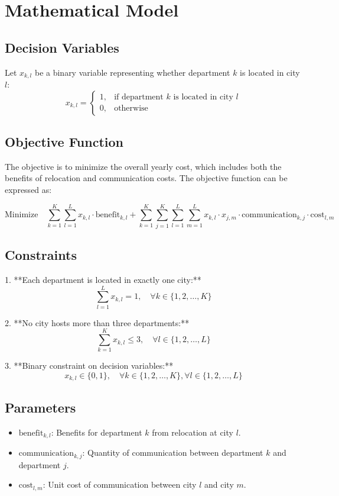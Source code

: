 \documentclass{article}
\begin{document}
\section*{Mathematical Model}

\subsection*{Decision Variables}
Let \( x_{k,l} \) be a binary variable representing whether department \( k \) is located in city \( l \):
\[
x_{k,l} = 
\begin{cases} 
1, & \text{if department } k \text{ is located in city } l \\
0, & \text{otherwise}
\end{cases}
\]

\subsection*{Objective Function}
The objective is to minimize the overall yearly cost, which includes both the benefits of relocation and communication costs. The objective function can be expressed as:

\[
\text{Minimize} \quad 
\sum_{k=1}^{K} \sum_{l=1}^{L} x_{k,l} \cdot \text{benefit}_{k,l} 
+ \sum_{k=1}^{K} \sum_{j=1}^{K} \sum_{l=1}^{L} \sum_{m=1}^{L} x_{k,l} \cdot x_{j,m} \cdot \text{communication}_{k,j} \cdot \text{cost}_{l,m}
\]

\subsection*{Constraints}

1. **Each department is located in exactly one city:**
   \[
   \sum_{l=1}^{L} x_{k,l} = 1, \quad \forall k \in \{1, 2, \ldots, K\}
   \]

2. **No city hosts more than three departments:**
   \[
   \sum_{k=1}^{K} x_{k,l} \leq 3, \quad \forall l \in \{1, 2, \ldots, L\}
   \]

3. **Binary constraint on decision variables:**
   \[
   x_{k,l} \in \{0, 1\}, \quad \forall k \in \{1, 2, \ldots, K\}, \forall l \in \{1, 2, \ldots, L\}
   \]

\subsection*{Parameters}
\begin{itemize}
    \item \( \text{benefit}_{k,l} \): Benefits for department \( k \) from relocation at city \( l \).
    \item \( \text{communication}_{k,j} \): Quantity of communication between department \( k \) and department \( j \).
    \item \( \text{cost}_{l,m} \): Unit cost of communication between city \( l \) and city \( m \).
\end{itemize}
\end{document}
